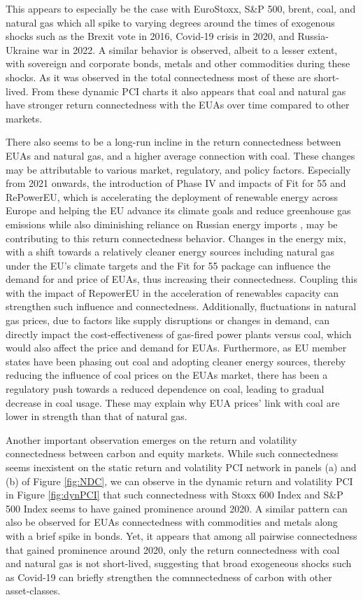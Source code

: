 \documentclass[preprint, 3p,
authoryear]{elsarticle} %
\begin{document}
This appears to especially be the case with EuroStoxx, S\&P 500, brent,
coal, and natural gas which all spike to varying degrees around the
times of exogenous shocks such as the Brexit vote in 2016, Covid-19
crisis in 2020, and Russia-Ukraine war in 2022. A similar behavior is
observed, albeit to a lesser extent, with sovereign and corporate bonds,
metals and other commodities during these shocks. As it was observed in
the total connectedness most of these are short-lived. From these
dynamic PCI charts it also appears that coal and natural gas have
stronger return connectedness with the EUAs over time compared to other
markets.

There also seems to be a long-run incline in the return connectedness
between EUAs and natural gas, and a higher average connection with coal.
These changes may be attributable to various market, regulatory, and
policy factors. Especially from 2021 onwards, the introduction of Phase
IV and impacts of Fit for 55 and RePowerEU, which is accelerating the
deployment of renewable energy across Europe and helping the EU advance
its climate goals and reduce greenhouse gas emissions while also
diminishing reliance on Russian energy imports \citep{repowereu_2024},
may be contributing to this return connectedness behavior. Changes in
the energy mix, with a shift towards a relatively cleaner energy sources
including natural gas under the EU's climate targets and the Fit for 55
package can influence the demand for and price of EUAs, thus increasing
their connectedness. Coupling this with the impact of RepowerEU in the
acceleration of renewables capacity can strengthen such influence and
connectedness. Additionally, fluctuations in natural gas prices, due to
factors like supply disruptions or changes in demand, can directly
impact the cost-effectiveness of gas-fired power plants versus coal,
which would also affect the price and demand for EUAs. Furthermore, as
EU member states have been phasing out coal and adopting cleaner energy
sources, thereby reducing the influence of coal prices on the EUAs
market, there has been a regulatory push towards a reduced dependence on
coal, leading to gradual decrease in coal usage. These may explain why
EUA prices' link with coal are lower in strength than that of natural
gas.

Another important observation emerges on the return and volatility
connectedness between carbon and equity markets. While such
connectedness seems inexistent on the static return and volatility PCI
network in panels (a) and (b) of Figure \ref{fig:NDC}, we can observe in
the dynamic return and volatility PCI in Figure \ref{fig:dynPCI} that
such connectedness with Stoxx 600 Index and S\&P 500 Index seems to have
gained prominence around 2020. A similar pattern can also be observed
for EUAs connectedness with commodities and metals along with a brief
spike in bonds. Yet, it appears that among all pairwise connectedness
that gained prominence around 2020, only the return connectedness with
coal and natural gas is not short-lived, suggesting that broad
exogeneous shocks such as Covid-19 can briefly strengthen the
comnnectedness of carbon with other asset-classes.
\end{document}
